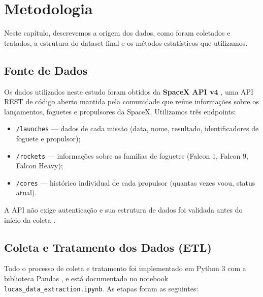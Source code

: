 
\chapter{Metodologia}
\label{chap:methodology}

Neste capítulo, descrevemos a origem dos dados, como foram coletados e tratados, a estrutura do dataset final e os métodos estatísticos que utilizamos.

\section{Fonte de Dados}

Os dados utilizados neste estudo foram obtidos da \textbf{SpaceX API v4} \cite{spacex_api}, uma API REST de código aberto mantida pela comunidade que reúne informações sobre os lançamentos, foguetes e propulsores da SpaceX. Utilizamos três endpoints:

\begin{itemize}
    \item \texttt{/launches} — dados de cada missão (data, nome, resultado, identificadores de foguete e propulsor);
    \item \texttt{/rockets} — informações sobre as famílias de foguetes (Falcon 1, Falcon 9, Falcon Heavy);
    \item \texttt{/cores} — histórico individual de cada propulsor (quantas vezes voou, status atual).
\end{itemize}

A API não exige autenticação e sua estrutura de dados foi validada antes do início da coleta \cite{spacex_api_docs}.

\section{Coleta e Tratamento dos Dados (ETL)}

Todo o processo de coleta e tratamento foi implementado em Python 3 \cite{python} com a biblioteca Pandas \cite{mckinney2010pandas}, e está documentado no notebook \texttt{lucas\_data\_extraction.ipynb}. As etapas foram as seguintes:

